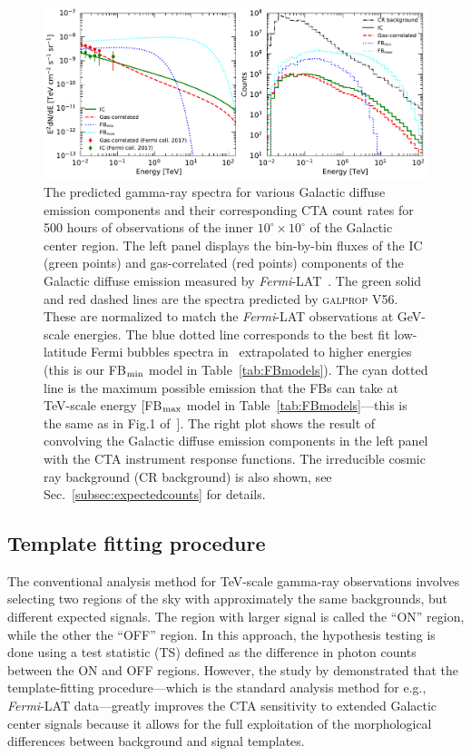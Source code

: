 \documentclass[doublespace,nopageskip]{VTthesis} %
\begin{document}
\begin{figure}[htb]
    \centering
    \includegraphics[width=\textwidth]{Figures/CTA/spectra-and-counts.pdf}
    \caption{The predicted gamma-ray spectra for various Galactic diffuse emission components and their corresponding CTA count rates for 500 hours of observations of the inner $10^\circ \times 10^\circ$ of the Galactic center region. The left panel displays the bin-by-bin fluxes of the IC (green points) and gas-correlated (red points) components of the Galactic diffuse emission measured by \textit{Fermi}-LAT~\citep{2017ApJ...840...43A}. The green solid and red dashed lines are the spectra predicted by \textsc{galprop V56}. These are normalized to match the \textit{Fermi}-LAT observations at GeV-scale energies. The blue dotted line corresponds to the best fit low-latitude Fermi bubbles spectra in~\citep{2017ApJ...840...43A} extrapolated to higher energies (this is our FB$_{\rm min}$ model in Table~\ref{tab:FBmodels}). The cyan dotted line is the maximum possible emission that the FBs can take at TeV-scale energy [FB$_{\rm max}$ model in Table~\ref{tab:FBmodels}---this is the same as in Fig.1 of~\citet{2021PhRvD.103b3011R}]. The right plot shows the result of convolving the Galactic diffuse emission components in the left panel with the CTA instrument response functions. The irreducible cosmic ray background (CR background) is also shown, see Sec.~\ref{subsec:expectedcounts} for details.}
    \label{fig:counts_spectra}
\end{figure}

\subsection{Template fitting procedure}
\label{sub:templatefitting}

The conventional analysis method for TeV-scale gamma-ray observations involves selecting two regions of the sky with approximately the same backgrounds, 
but different expected signals. The region with larger signal is called the ``ON'' region, while the other the ``OFF'' region. In this approach, the hypothesis testing is done using a test statistic (TS) defined as the difference in photon counts between the ON and OFF regions. However, the study by \cite{2015JCAP...03..055S} demonstrated that the template-fitting procedure---which is the standard analysis method for e.g., \textit{Fermi}-LAT data---greatly improves the CTA sensitivity to extended Galactic center signals because it allows for the full exploitation of the morphological differences between background and signal templates. 
\end{document}
